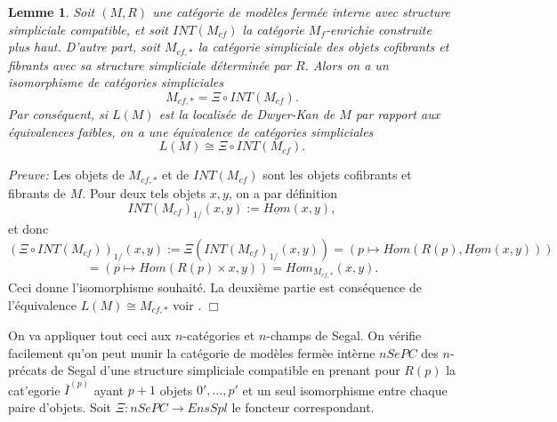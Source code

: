 \documentclass[12pt]{article}
\newcommand{\eop}{\hfill $\Box$\vspace{.1in}}
\newtheorem{lemme}[lemma]{Lemme}
\begin{document}
\begin{lemme}
\label{splinterne}
Soit $(M,R)$ une cat\'egorie de mod\`eles ferm\'ee interne avec structure
simpliciale compatible, et soit $INT(M_{cf})$ la cat\'egorie $M_f$-enrichie
construite plus haut. D'autre part, soit $M_{cf,\ast}$ la cat\'egorie
simpliciale des objets cofibrants et fibrants avec sa structure simpliciale
d\'etermin\'ee par $R$. Alors on a un isomorphisme de cat\'egories
simpliciales
$$
M_{cf, \ast} = \Xi \circ  INT(M_{cf}).
$$
Par cons\'equent, si $L(M)$ est la localis\'ee de Dwyer-Kan de $M$ par rapport
aux \'equivalences faibles, on a une \'equivalence de cat\'egories simpliciales
$$
L(M)\cong \Xi \circ INT(M_{cf}).
$$
\end{lemme}
{\em Preuve:}
Les objets de $M_{cf, \ast}$ et de $INT(M_{cf})$ sont les objets cofibrants et
fibrants de $M$. Pour deux tels objets $x,y$, on a par d\'efinition
$$
INT(M_{cf})_{1/}(x,y):= \underline{Hom}(x,y),
$$
et donc
$$
(\Xi \circ INT(M_{cf}))_{1/}(x,y):= \Xi (INT(M_{cf})_{1/}(x,y))
= \left( p\mapsto Hom (R(p), \underline{Hom}(x,y)) \right)
$$
$$
= \left( p\mapsto Hom (R(p)\times x,y) \right)
= Hom _{M_{cf, \ast}}(x,y).
$$
Ceci donne l'isomorphisme souhait\'e. La deuxi\`eme partie est cons\'equence
de l'\'equivalence $L(M) \cong M_{cf, \ast}$ voir \cite{DwyerKan2}.
\eop

On va appliquer tout ceci aux $n$-cat\'egories et $n$-champs de Segal.
On v\'erifie facilement qu'on peut munir la
cat\'egorie de mod\`eles ferm\`ee int\`erne $nSePC$  des $n$-pr\'ecats de Segal
d'une structure simpliciale compatible en prenant pour $R(p)$
la cat'egorie $\overline{I}^{(p)}$
ayant $p+1$ objets $0',\ldots , p'$
et un seul isomorphisme entre chaque paire d'objets. Soit
$\Xi : nSePC \rightarrow EnsSpl$ le foncteur correspondant.
\end{document}
